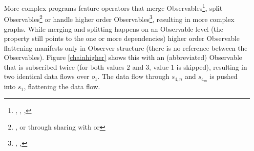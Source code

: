 More complex programs feature operators that merge Observables\footnote{
	, , , 
}, split Observables\footnote{
	, or through sharing with  or 
} or handle higher order Observables\footnote{
	, , 
}, resulting in more complex graphs. While merging and splitting happens on an Observable level (the  property still points to the one or more dependencies) higher order Observable flattening manifests only in Observer structure (there is no reference between the Observables). Figure \ref{chainhigher} shows this with an (abbreviated)  Observable that is subscribed twice (for both values $2$ and $3$, value 1 is skipped), resulting in two identical data flows over $o_1$. The data flow through $s_{4,n}$ and $s_{4_m}$ is pushed into $s_1$, flattening the data flow. 
